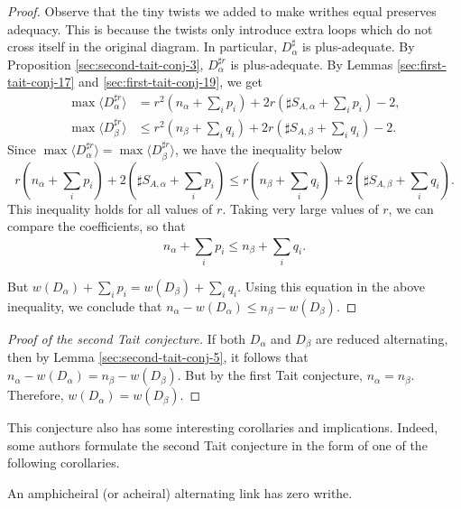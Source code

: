 \begin{proof}
Observe that the tiny twists we added to make writhes equal preserves adequacy. This is because the twists only introduce extra loops which do not cross itself in the original diagram. In particular, $D_{\alpha}^{\sharp}$ is plus-adequate. By Proposition \ref{sec:second-tait-conj-3}, $D_{\alpha}^{\sharp r}$ is plus-adequate. By Lemmas \ref{sec:first-tait-conj-17} and \ref{sec:first-tait-conj-19}, we get 
\begin{align*}
  \max\langle D_{\alpha}^{\sharp r} \rangle &= r^2(n_{\alpha} + \sum_i^{} p_i) + 2r(\sharp S_{A,\alpha} + \sum_i^{} p_i) - 2, \\
  \max\langle D_{\beta}^{\sharp r} \rangle &\leq r^2(n_{\beta} + \sum_i^{} q_i) + 2r(\sharp S_{A,\beta} + \sum_i^{} q_i) - 2.  
\end{align*}
Since $\max\langle D_{\alpha}^{\sharp r}\rangle = \max\langle D_{\beta}^{\sharp r}\rangle$, we have the inequality below 
\begin{displaymath}
  r(n_{\alpha} + \sum_i^{} p_i) + 2(\sharp S_{A,\alpha} + \sum_i^{} p_i) \leq r(n_{\beta} + \sum_i^{} q_i) + 2(\sharp S_{A,\beta} + \sum_i^{} q_i).
\end{displaymath}
This inequality holds for all values of $r$. Taking very large values of $r$, we can compare the coefficients, so that 
\begin{displaymath}
n_{\alpha} + \sum_i^{} p_i \leq n_{\beta} + \sum_i^{} q_i.
\end{displaymath}

But $w(D_{\alpha}) + \sum_i^{} p_i = w(D_{\beta}) + \sum_i^{}q_i$. Using this equation in the above inequality, we conclude that $n_{\alpha} - w(D_{\alpha}) \leq n_{\beta} - w(D_{\beta})$.
\end{proof}

\begin{proof}[Proof of the second Tait conjecture]
\label{sec:second-tait-conj-6}
  If both $D_{\alpha}$ and $D_{\beta}$ are reduced alternating, then by Lemma \ref{sec:second-tait-conj-5}, it follows that $n_{\alpha} - w(D_{\alpha}) = n_{\beta} - w(D_{\beta})$. But by the first Tait conjecture, $n_{\alpha} = n_{\beta}$. Therefore, $w(D_{\alpha}) = w(D_{\beta})$. 
\end{proof}

This conjecture also has some interesting corollaries and implications. Indeed, some authors formulate the second Tait conjecture in the form of one of the following corollaries.

\begin{corollary}
\label{sec:second-tait-conj-8}
  An amphicheiral (or acheiral) alternating link has zero writhe.
\end{corollary}

